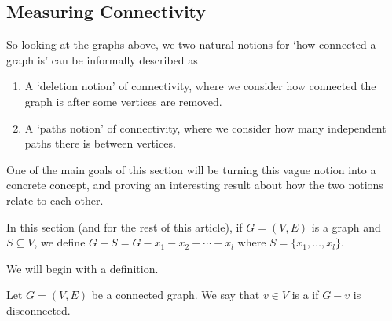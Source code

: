 \subsection{Measuring Connectivity}

So looking at the graphs above, we two natural notions for `how connected a graph is' can be informally described as
\begin{enumerate}
	\item A `deletion notion' of connectivity, where we consider how connected the graph is after some vertices are removed.
	\item A `paths notion' of connectivity, where we consider how many independent paths there is between vertices.
\end{enumerate}

One of the main goals of this section will be turning this vague notion into a concrete concept, and proving an interesting result about how the two notions relate to each other.

\begin{notation}
	In this section (and for the rest of this article), if $G = (V, E)$ is a graph and $S \subseteq V$, we define $G - S = G - x_1 - x_2 - \cdots - x_l$ where $S = \{x_1, \dots, x_l\}$.
\end{notation}

We will begin with a definition.

\begin{definition}
Let $G = (V, E)$ be a connected graph. We say that $v \in V$ is a  if $G - v$ is disconnected.	
\end{definition}

